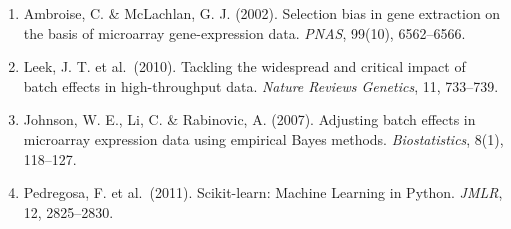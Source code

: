 \documentclass[11pt,a4paper]{article}
\begin{document}
\begin{enumerate}
  cross-validation for model selection. \emph{BMC Bioinformatics}, 7, 91.
\item
  Ambroise, C. \& McLachlan, G. J. (2002). Selection bias in gene extraction on
  the basis of microarray gene-expression data. \emph{PNAS}, 99(10), 6562--6566.
\item
  Leek, J. T. et al.~(2010). Tackling the widespread and critical impact of
  batch effects in high-throughput data. \emph{Nature Reviews Genetics}, 11,
  733--739.
\item
  Johnson, W. E., Li, C. \& Rabinovic, A. (2007). Adjusting batch effects in
  microarray expression data using empirical Bayes methods.
  \emph{Biostatistics}, 8(1), 118--127.
\item
  Pedregosa, F. et al.~(2011). Scikit-learn: Machine Learning in Python.
  \emph{JMLR}, 12, 2825--2830.
\end{enumerate}
\end{document}
